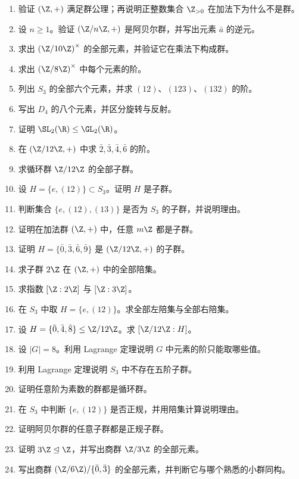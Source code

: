 \begin{enumerate}[label=\textbf{习题6.\arabic*.}, leftmargin=7em]
  \item \basic 验证 $(\Z,+)$ 满足群公理；再说明正整数集合 $\Z_{>0}$ 在加法下为什么不是群。
  \item \basic 设 $n\ge1$。验证 $(\Z/n\Z,+)$ 是阿贝尔群，并写出元素 $\bar a$ 的逆元。
  \item \basic 求出 $\left(\Z/10\Z\right)^\times$ 的全部元素，并验证它在乘法下构成群。
  \item \basic 求出 $\left(\Z/8\Z\right)^\times$ 中每个元素的阶。
  \item \basic 列出 $S_3$ 的全部六个元素，并求 $(12)$、$(123)$、$(132)$ 的阶。
  \item \basic 写出 $D_4$ 的八个元素，并区分旋转与反射。
  \item \basic 证明 $\SL_2(\R)\le \GL_2(\R)$。
  \item \basic 在 $(\Z/12\Z,+)$ 中求 $\bar 2,\bar 3,\bar 4,\bar 6$ 的阶。
  \item \basic 求循环群 $\Z/12\Z$ 的全部子群。
  \item \basic 设 $H=\{e,(12)\}\subset S_3$。证明 $H$ 是子群。
  \item \basic 判断集合 $\{e,(12),(13)\}$ 是否为 $S_3$ 的子群，并说明理由。
  \item \basic 证明在加法群 $(\Z,+)$ 中，任意 $m\Z$ 都是子群。
  \item \basic 证明 $H=\{\bar 0,\bar 3,\bar 6,\bar 9\}$ 是 $(\Z/12\Z,+)$ 的子群。
  \item \basic 求子群 $2\Z$ 在 $(\Z,+)$ 中的全部陪集。
  \item \basic 求指数 $[\Z:2\Z]$ 与 $[\Z:3\Z]$。
  \item \basic 在 $S_3$ 中取 $H=\{e,(12)\}$。求全部左陪集与全部右陪集。
  \item \basic 设 $H=\{\bar 0,\bar 4,\bar 8\}\le \Z/12\Z$。求 $[\Z/12\Z:H]$。
  \item \basic 设 $|G|=8$。利用 Lagrange 定理说明 $G$ 中元素的阶只能取哪些值。
  \item \basic 利用 Lagrange 定理说明 $S_3$ 中不存在五阶子群。
  \item \basic 证明任意阶为素数的群都是循环群。
  \item \basic 在 $S_3$ 中判断 $\{e,(12)\}$ 是否正规，并用陪集计算说明理由。
  \item \basic 证明阿贝尔群的任意子群都是正规子群。
  \item \basic 证明 $3\Z\trianglelefteq \Z$，并写出商群 $\Z/3\Z$ 的全部元素。
  \item \basic 写出商群 $(\Z/6\Z)/\{\bar 0,\bar 3\}$ 的全部元素，并判断它与哪个熟悉的小群同构。

\end{enumerate}
